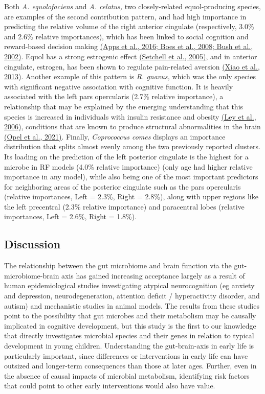 \documentclass[
]{article}
\begin{document}
Both \emph{A. equolofaciens} and \emph{A. celatus,} two closely-related
equol-producing species, are examples of the second contribution
pattern, and had high importance in predicting the relative volume of
the right anterior cingulate (respectively, 3.0\% and 2.6\% relative
importances), which has been linked to social cognition and reward-based
decision making \href{https://www.zotero.org/google-docs/?Wi8Bpq}{(Apps
et al., 2016; Boes et al., 2008; Bush et al., 2002)}. Equol has a strong
estrogenic effect
\href{https://www.zotero.org/google-docs/?PqgFU7}{(Setchell et al.,
2005)}, and in anterior cingulate, estrogen, has been shown to regulate
pain-related aversion
\href{https://www.zotero.org/google-docs/?5huRIR}{(Xiao et al., 2013)}.
Another example of this pattern is \emph{R. gnavus,} which was the only
species with significant negative association with cognitive function.
It is heavily associated with the left pars opercularis (2.7\% relative
importance), a relationship that may be explained by the emerging
understanding that this species is increased in individuals with insulin
resistance and obesity
\href{https://www.zotero.org/google-docs/?lwzWUv}{(Ley et al., 2006)},
conditions that are known to produce structural abnormalities in the
brain \href{https://www.zotero.org/google-docs/?NlkFr6}{(Opel et al.,
2021)}. Finally, \emph{Coprococcus comes} displays an importance
distribution that splits almost evenly among the two previously reported
clusters. Its loading on the prediction of the left posterior cingulate
is the highest for a microbe in RF models (4.0\% relative importance)
(only age had higher relative importance in any model), while also being
one of the most important predictors for neighboring areas of the
posterior cingulate such as the pars opercularis (relative importances,
Left = 2.3\%, Right = 2.8\%), along with upper regions like the left
precentral (2.3\% relative importance) and paracentral lobes (relative
importances, Left = 2.6\%, Right = 1.8\%).

\hypertarget{discussion}{%
\subsection{Discussion}\label{discussion}}

The relationship between the gut microbiome and brain function via the
gut-microbiome-brain axis has gained increasing acceptance largely as a
result of human epidemiological studies investigating atypical
neurocognition (eg anxiety and depression, neurodegeneration, attention
deficit / hyperactivity disorder, and autism) and mechanistic studies in
animal models. The results from these studies point to the possibility
that gut microbes and their metabolism may be causally implicated in
cognitive development, but this study is the first to our knowledge that
directly investigates microbial species and their genes in relation to
typical development in young children. Understanding the gut-brain-axis
in early life is particularly important, since differences or
interventions in early life can have outsized and longer-term
consequences than those at later ages. Further, even in the absence of
causal impacts of microbial metabolism, identifying risk factors that
could point to other early interventions would also have value.
\end{document}
